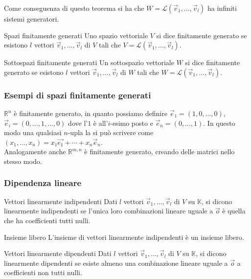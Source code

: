 Come conseguenza di questo teorema si ha che $W=\mathscr{L}(\vec{v}_1,\ldots,\vec{v}_l)$
ha infiniti sistemi generatori.

\begin{Def}{Spazi finitamente generati}
  Uno spazio vettoriale $V$ si dice finitamente generato se esistono $l$ vettori
  $\vec{v}_1,\ldots,\vec{v}_l$ di $V$ tali che $V=\mathscr{L}(\vec{v}_1,\ldots,\vec{v}_l
  )$.
\end{Def}

\begin{Def}{Sottospazi finitamente generati}
  Un sottospazio vettoriale $W$ si dice finitamente generato se esistono $l$ vettori
  $\vec{v}_1,\ldots,\vec{v}_l$ di $W$ tali che $W=\mathscr{L}(\vec{v}_1,\ldots,\vec{v}_l
  )$.
\end{Def}

\subsubsection{Esempi di spazi finitamente generati}%
\label{ssub:esempi_di_spazi_finitamente_generati}

$\mathbb{R}^n$ è finitamente generato, in quanto possiamo definire
$\vec{e}_1=(1,0,\ldots,0)$, $\vec{e}_i=(0,\ldots,1,\ldots,0)$ dove l'$1$ è all'$i$-esimo
posto e $\vec{e}_n=(0,\ldots,1)$. In questo modo una qualsiasi $n$-upla la si può
scrivere come $(x_1,\ldots,x_n)=x_1\vec{e_1}+\cdots+x_n\vec{e}_n$.\\
Analogamente anche $\mathbb{R}^{m,n}$ è finitamente generato, creando delle matrici
nello stesso modo.

\subsubsection{Dipendenza lineare}%
\label{sub:dipendenza_lineare}

\begin{Def}{Vettori linearmente indipendenti}
  Dati $l$ vettori $\vec{v}_1,\ldots,\vec{v}_l$ di $V$ su $\mathbb{K}$, si dicono
  linearmente indipendenti se l'unica loro combinazioni lineare uguale a $\vec{o}$ è
  quella che ha coefficienti tutti nulli.
\end{Def}

\begin{SubDef}{Insieme libero}
  L'insieme di vettori linearmente indipendenti è un insieme libero.
\end{SubDef}

\begin{Def}{Vettori linearmente dipendenti}
  Dati $l$ vettori $\vec{v}_1,\ldots,\vec{v}_l$ di $V$ su $\mathbb{K}$, si dicono
  linearmente dipendenti se esiste almeno una combinazione lineare uguale a $\vec{o}$ a
  coefficienti non tutti nulli.
\end{Def}

